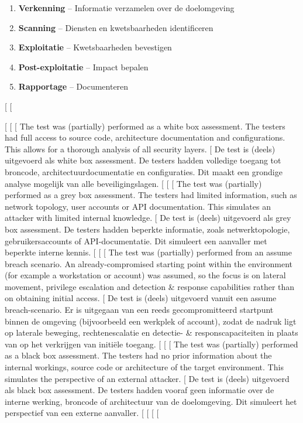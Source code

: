 {{{{\begin{enumerate}
  \item \textbf{Verkenning} -- Informatie verzamelen over de doelomgeving
  \item \textbf{Scanning} -- Diensten en kwetsbaarheden identificeren
  \item \textbf{Exploitatie} -- Kwetsbaarheden bevestigen
  \item \textbf{Post-exploitatie} -- Impact bepalen
  \item \textbf{Rapportage} -- Documenteren
\end{enumerate}
[%
[%

[%
[%
[%
The test was (partially) performed as a white box assessment. The testers had full access to source code,
architecture documentation and configurations. This allows for a thorough analysis of all security layers.
[%
De test is (deels) uitgevoerd als white box assessment. De testers hadden volledige toegang tot broncode,
architectuurdocumentatie en configuraties. Dit maakt een grondige analyse mogelijk van alle
beveiligingslagen.
[%
[%
[%
The test was (partially) performed as a grey box assessment. The testers had limited information, such as
network topology, user accounts or API documentation. This simulates an attacker with limited internal knowledge.
[%
De test is (deels) uitgevoerd als grey box assessment. De testers hadden beperkte informatie, zoals
netwerktopologie, gebruikersaccounts of API-documentatie. Dit simuleert een aanvaller met
beperkte interne kennis.
[%
[%
[%
The test was (partially) performed from an assume breach scenario. An already-compromised starting point within
the environment (for example a workstation or account) was assumed, so the focus is on lateral movement, privilege
escalation and detection \& response capabilities rather than on obtaining initial access.
[%
De test is (deels) uitgevoerd vanuit een assume breach-scenario. Er is uitgegaan van een reeds gecompromitteerd
startpunt binnen de omgeving (bijvoorbeeld een werkplek of account), zodat de nadruk ligt op laterale beweging,
rechtenescalatie en detectie- \& responscapaciteiten in plaats van op het verkrijgen van initiële toegang.
[%
[%
[%
The test was (partially) performed as a black box assessment. The testers had no prior information about the
internal workings, source code or architecture of the target environment. This simulates the perspective of
an external attacker.
[%
De test is (deels) uitgevoerd als black box assessment. De testers hadden vooraf geen informatie over de
interne werking, broncode of architectuur van de doelomgeving. Dit simuleert het perspectief van
een externe aanvaller.
[%
[%
[%
[%

}}}}
